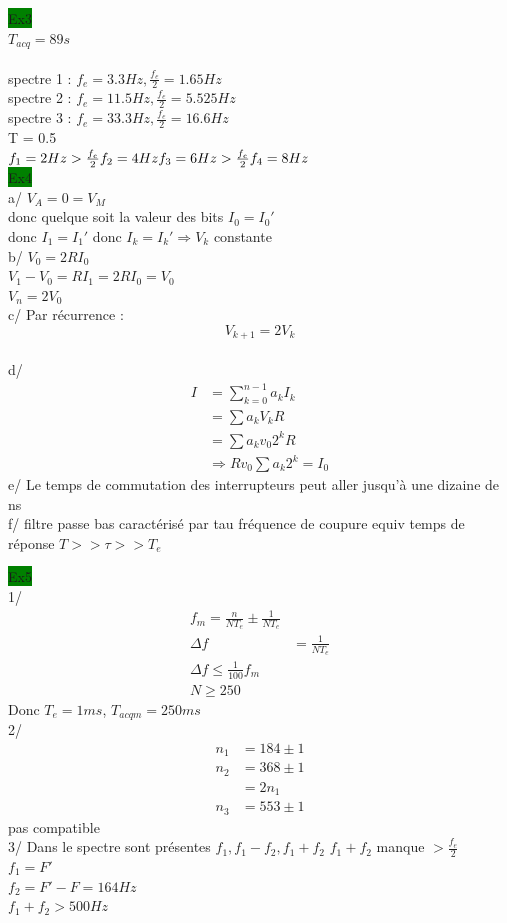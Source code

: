 \documentclass[a4paper,twocolumn,landscape]{article}
\begin{document}
\noindent
\colorbox{green}{Ex3}\\
\(T_{acq} = 89s\)\\
\\
spectre 1 : \(f_e = 3.3 Hz, \frac{f_e}{2} = 1.65Hz\)\\
spectre 2 : \(f_e = 11.5Hz, \frac{f_e}{2} = 5.525Hz\)\\
spectre 3 : \(f_e = 33.3Hz, \frac{f_e}{2} = 16.6Hz\)\\
T = 0.5\\
\(f_1 = 2Hz > \frac{f_e}{2}\\
f_2 = 4Hz  \\
f_3 = 6Hz > \frac{f_e}{2}\\
f_4 = 8Hz\)\\

\noindent
\colorbox{green}{Ex4}\\
a/ \(V_A = 0 = V_M\)\\
donc quelque soit la valeur des bits 
\(I_0 = I_0'\)\\
donc \(I_1 = I_1'\)
donc \(I_k = I_k' \Rightarrow V_k\) constante\\
b/ \(V_0 = 2RI_0\)\\
\(V_1 - V_0 = RI_1 = 2RI_0 = V_0\)\\
\(V_n = 2V_0\)\\
c/ Par récurrence : \begin{equation*}
    V_{k+1} = 2V_k
\end{equation*}\\
d/  \begin{align*}
    I &= \sum_{k=0}^{n-1} a_k I_k\\
    &= \sum a_k V_k R\\
    &= \sum a_k v_0 2^k R\\
    &\Rightarrow R v_0 \sum a_k 2^k = I_0
\end{align*}
e/ Le temps de commutation des interrupteurs peut aller 
jusqu'à une dizaine de ns\\
f/ filtre passe bas caractérisé par tau
fréquence de coupure equiv temps de réponse 
\(T >> \tau >> T_e\)

\noindent \colorbox{green}{Ex5}\\
1/ \begin{align*}
    f_m = \frac{n}{NT_e} \pm \frac{1}{NT_e}\\
    \Delta f &= \frac{1}{NT_e}\\
    \Delta f \leq \frac{1}{100}f_m\\
    N \geq 250
\end{align*}
Donc \(T_e = 1ms\), \(T_{acqm} = 250ms\)\\
2/ \begin{align*}
    n_1 &= 184 \pm 1\\
    n_2 &= 368 \pm 1\\
    &= 2n_1\\
    n_3 &= 553 \pm 1
\end{align*}
pas compatible\\
3/ Dans le spectre sont présentes \(f_1, f_1 - f_2, f_1 + f_2\)
\(f_1 + f_2\) manque \(> \frac{f_e}{2}\)\\
\(f_1 = F'\)\\
\(f_2 = F'-F = 164Hz\)\\
\(f_1 + f_2 > 500Hz\)
\end{document}
